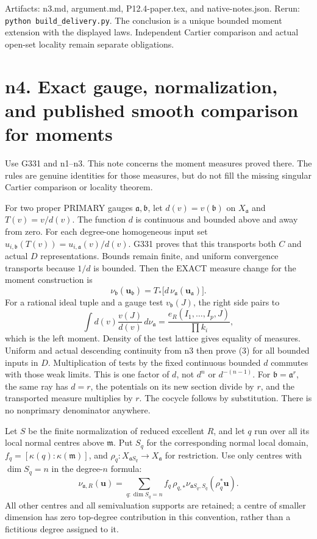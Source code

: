 \documentclass[
  11pt,
]{article}
\begin{document}
Artifacts: n3.md, argument.md, P12.4-paper.tex, and native-notes.json.
Rerun: \texttt{python\ build\_delivery.py}. The conclusion is a unique
bounded moment extension with the displayed laws. Independent Cartier
comparison and actual open-set locality remain separate obligations.

\section{n4. Exact gauge, normalization, and published smooth comparison
for
moments}\label{n4.-exact-gauge-normalization-and-published-smooth-comparison-for-moments}

Use G331 and n1--n3. This note concerns the moment measures proved
there. The rules are genuine identities for those measures, but do not
fill the missing singular Cartier comparison or locality theorem.

For two proper PRIMARY gauges \(\mathfrak a,\mathfrak b\), let
\(d(v)=v(\mathfrak b)\) on \(X_{\mathfrak a}\) and \(T(v)=v/d(v)\). The
function \(d\) is continuous and bounded above and away from zero. For
each degree-one homogeneous input set
\(u_{i,\mathfrak b}(T(v))=u_{i,\mathfrak a}(v)/d(v)\). G331 proves that
this transports both \(C\) and actual \(D\) representations. Bounds
remain finite, and uniform convergence transports because \(1/d\) is
bounded. Then the EXACT measure change for the moment construction is
\[\nu_{\mathfrak b}(\boldsymbol u_{\mathfrak b})=T_*\big[d\,\nu_{\mathfrak a}(\boldsymbol u_{\mathfrak a})\big].\tag{3}\]
For a rational ideal tuple and a gauge test \(v_{\mathfrak b}(J)\), the
right side pairs to
\[\int d(v)\frac{v(J)}{d(v)}\,d\nu_{\mathfrak a}=\frac{e_R(I_1,\ldots,I_p,J)}{\prod k_i},\]
which is the left moment. Density of the test lattice gives equality of
measures. Uniform and actual descending continuity from n3 then prove
(3) for all bounded inputs in \(D\). Multiplication of tests by the
fixed continuous bounded \(d\) commutes with those weak limits. This is
one factor of \(d\), not \(d^n\) or \(d^{-(n-1)}\). For
\(\mathfrak b=\mathfrak a^r\), the same ray has \(d=r\), the potentials
on its new section divide by \(r\), and the transported measure
multiplies by \(r\). The cocycle follows by substitution. There is no
nonprimary denominator anywhere.

Let \(S\) be the finite normalization of reduced excellent \(R\), and
let \(q\) run over all its local normal centres above \(\mathfrak m\).
Put \(S_q\) for the corresponding normal local domain,
\(f_q=[\kappa(q):\kappa(\mathfrak m)]\), and
\(\rho_q:X_{\mathfrak a S_q}\to X_{\mathfrak a}\) for restriction. Use
only centres with \(\dim S_q=n\) in the degree-\(n\) formula:
\[\nu_{\mathfrak a,R}(\boldsymbol u)=\sum_{q:\dim S_q=n} f_q\,\rho_{q,*}\nu_{\mathfrak a S_q,S_q}(\rho_q^*\boldsymbol u).\tag{4}\]
All other centres and all semivaluation supports are retained; a centre
of smaller dimension has zero top-degree contribution in this
convention, rather than a fictitious degree assigned to it.
\end{document}
